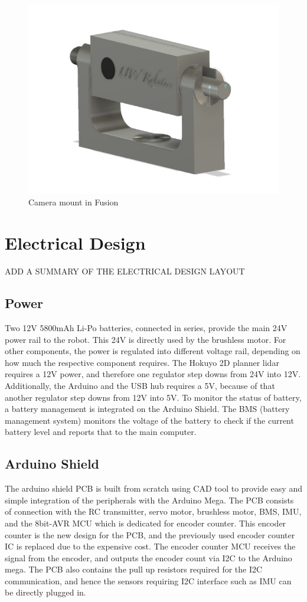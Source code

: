 \documentclass[11pt,journal]{IEEEtran}
\begin{document}
\begin{figure}[h]
\centerline{\includegraphics[width=0.5\columnwidth]{2018DesignMechCamMount.png}}
\caption{Camera mount in Fusion}
\label{CameraMounts}
\end{figure}

\section{Electrical Design}
ADD A SUMMARY OF THE ELECTRICAL DESIGN LAYOUT
\subsection{Power}
Two 12V 5800mAh Li-Po batteries, connected in series, provide the main 24V power rail to the robot. This 24V is directly used by the brushless motor. For other components, the power is regulated into different voltage rail, depending on how much the respective component requires. The Hokuyo 2D planner lidar requires a 12V power, and therefore one regulator step downs from 24V into 12V.  Additionally, the Arduino and the USB hub requires a 5V, because of that another regulator step downs from 12V into 5V. To monitor the status of battery, a battery management is integrated on the Arduino Shield. The BMS (battery management system) monitors the voltage of the battery to check if the current battery level and reports that to the main computer.

\subsection{Arduino Shield}
The arduino shield PCB is built from scratch using CAD tool to provide easy and simple integration of the peripherals with the Arduino Mega. The PCB consists of connection with the RC transmitter, servo motor, brushless motor, BMS, IMU, and the 8bit-AVR MCU which is dedicated for encoder counter. This encoder counter is the new design for the PCB, and the previously used encoder counter IC is replaced due to the expensive cost. The encoder counter MCU receives the signal from the encoder, and outputs the encoder count via I2C to the Arduino mega. The PCB also contains the pull up resistors required for the I2C communication, and hence the sensors requiring I2C interface such as IMU can be directly plugged in. 
\end{document}

